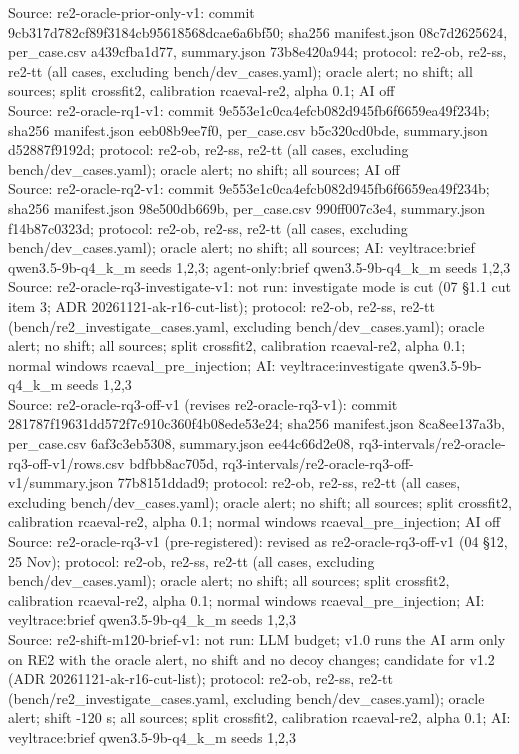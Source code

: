 \begin{table}[t]
Source: re2-oracle-prior-only-v1: commit 9cb317d782cf89f3184cb95618568dcae6a6bf50; sha256 manifest.json 08c7d2625624, per\_case.csv a439cfba1d77, summary.json 73b8e420a944; protocol: re2-ob, re2-ss, re2-tt (all cases, excluding bench/dev\_cases.yaml); oracle alert; no shift; all sources; split crossfit2, calibration rcaeval-re2, alpha 0.1; AI off\\
Source: re2-oracle-rq1-v1: commit 9e553e1c0ca4efcb082d945fb6f6659ea49f234b; sha256 manifest.json eeb08b9ee7f0, per\_case.csv b5c320cd0bde, summary.json d52887f9192d; protocol: re2-ob, re2-ss, re2-tt (all cases, excluding bench/dev\_cases.yaml); oracle alert; no shift; all sources; AI off\\
Source: re2-oracle-rq2-v1: commit 9e553e1c0ca4efcb082d945fb6f6659ea49f234b; sha256 manifest.json 98e500db669b, per\_case.csv 990ff007c3e4, summary.json f14b87c0323d; protocol: re2-ob, re2-ss, re2-tt (all cases, excluding bench/dev\_cases.yaml); oracle alert; no shift; all sources; AI: veyltrace:brief qwen3.5-9b-q4\_k\_m seeds 1,2,3; agent-only:brief qwen3.5-9b-q4\_k\_m seeds 1,2,3\\
Source: re2-oracle-rq3-investigate-v1: not run: investigate mode is cut (07 \S{}1.1 cut item 3; ADR 20261121-ak-r16-cut-list); protocol: re2-ob, re2-ss, re2-tt (bench/re2\_investigate\_cases.yaml, excluding bench/dev\_cases.yaml); oracle alert; no shift; all sources; split crossfit2, calibration rcaeval-re2, alpha 0.1; normal windows rcaeval\_pre\_injection; AI: veyltrace:investigate qwen3.5-9b-q4\_k\_m seeds 1,2,3\\
Source: re2-oracle-rq3-off-v1 (revises re2-oracle-rq3-v1): commit 281787f19631dd572f7c910c360f4b08ede53e24; sha256 manifest.json 8ca8ee137a3b, per\_case.csv 6af3c3eb5308, summary.json ee44c66d2e08, rq3-intervals/re2-oracle-rq3-off-v1/rows.csv bdfbb8ac705d, rq3-intervals/re2-oracle-rq3-off-v1/summary.json 77b8151ddad9; protocol: re2-ob, re2-ss, re2-tt (all cases, excluding bench/dev\_cases.yaml); oracle alert; no shift; all sources; split crossfit2, calibration rcaeval-re2, alpha 0.1; normal windows rcaeval\_pre\_injection; AI off\\
Source: re2-oracle-rq3-v1 (pre-registered): revised as re2-oracle-rq3-off-v1 (04 \S{}12, 25 Nov); protocol: re2-ob, re2-ss, re2-tt (all cases, excluding bench/dev\_cases.yaml); oracle alert; no shift; all sources; split crossfit2, calibration rcaeval-re2, alpha 0.1; normal windows rcaeval\_pre\_injection; AI: veyltrace:brief qwen3.5-9b-q4\_k\_m seeds 1,2,3\\
Source: re2-shift-m120-brief-v1: not run: LLM budget; v1.0 runs the AI arm only on RE2 with the oracle alert, no shift and no decoy changes; candidate for v1.2 (ADR 20261121-ak-r16-cut-list); protocol: re2-ob, re2-ss, re2-tt (bench/re2\_investigate\_cases.yaml, excluding bench/dev\_cases.yaml); oracle alert; shift -120 s; all sources; split crossfit2, calibration rcaeval-re2, alpha 0.1; AI: veyltrace:brief qwen3.5-9b-q4\_k\_m seeds 1,2,3\\

\end{table}
